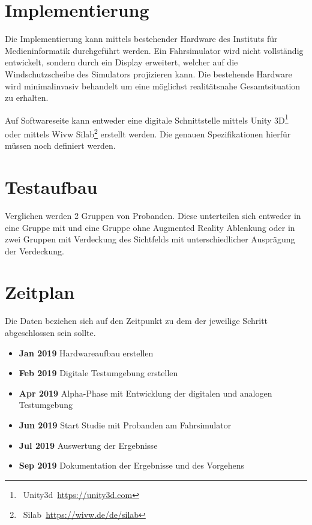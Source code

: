 \documentclass[a4paper, 11pt]{article}
\begin{document}
\section*{Implementierung}
Die Implementierung kann mittels bestehender Hardware des Instituts für Medieninformatik durchgeführt werden. Ein Fahrsimulator wird nicht vollständig entwickelt, sondern durch ein Display erweitert, welcher auf die Windschutzscheibe des Simulators projizieren kann. Die bestehende Hardware wird minimalinvasiv behandelt um eine möglichst realitätsnahe Gesamtsituation zu erhalten. 

Auf Softwareseite kann entweder eine digitale Schnittstelle mittels Unity 3D\footnote{~Unity3d~\url{https://unity3d.com}} oder mittels Wivw Silab\footnote{~Silab~\url{https://wivw.de/de/silab}} erstellt werden. Die genauen Spezifikationen hierfür müssen noch definiert werden.

\section*{Testaufbau}
Verglichen werden 2 Gruppen von Probanden. Diese unterteilen sich entweder in eine Gruppe mit und eine Gruppe ohne Augmented Reality Ablenkung oder in zwei Gruppen mit Verdeckung des Sichtfelds mit unterschiedlicher Ausprägung der Verdeckung.

\section*{Zeitplan}
Die Daten beziehen sich auf den Zeitpunkt zu dem der jeweilige Schritt abgeschlossen sein sollte.
\begin{itemize}
    \item \textbf{Jan 2019} Hardwareaufbau erstellen
    \item \textbf{Feb 2019} Digitale Testumgebung erstellen
    \item \textbf{Apr 2019} Alpha-Phase mit Entwicklung der digitalen und analogen Testumgebung
    \item \textbf{Jun 2019} Start Studie mit Probanden am Fahrsimulator
    \item \textbf{Jul 2019} Auswertung der Ergebnisse
    \item \textbf{Sep 2019} Dokumentation der Ergebnisse und des Vorgehens
\end{itemize}
\end{document}
